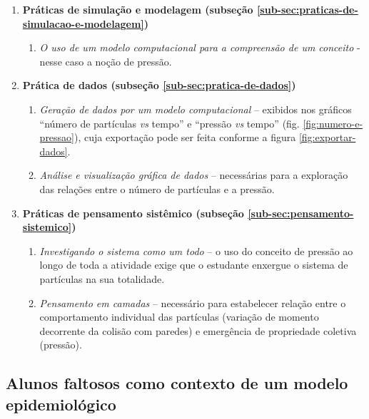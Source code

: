\begin{enumerate}

  \item \textbf{Práticas de simulação e modelagem (subseção \ref{sub-sec:praticas-de-simulacao-e-modelagem})}
    \begin{enumerate}
      \item \textit{O uso de um modelo computacional para a compreensão de um conceito} - nesse caso a noção de pressão.
    \end{enumerate}

  \item \textbf{Prática de dados (subseção \ref{sub-sec:pratica-de-dados})}
    \begin{enumerate}
      \item \textit{Geração de dados por um modelo computacional} -- exibidos nos gráficos ``número de partículas \textit{vs} tempo'' e ``pressão \textit{vs} tempo'' (fig. \ref{fig:numero-e-pressao}), cuja exportação pode ser feita conforme a figura \ref{fig:exportar-dados}.

      \item \textit{Análise e visualização gráfica de dados} -- necessárias para a exploração das relações entre o número de partículas e a pressão.
    \end{enumerate}

  \item \textbf{Práticas de pensamento sistêmico (subseção \ref{sub-sec:pensamento-sistemico})}

    \begin{enumerate}
      \item \textit{Investigando o sistema como um todo} -- o uso do conceito de pressão ao longo de toda a atividade exige que o estudante enxergue o sistema de partículas na sua totalidade.        
      \item \textit{Pensamento em camadas} -- necessário para estabelecer relação entre o comportamento individual das partículas (variação de momento decorrente da colisão com paredes) e emergência de propriedade coletiva (pressão).
    \end{enumerate}
  
\end{enumerate}

\subsection{Alunos faltosos como contexto de um modelo epidemiológico}

